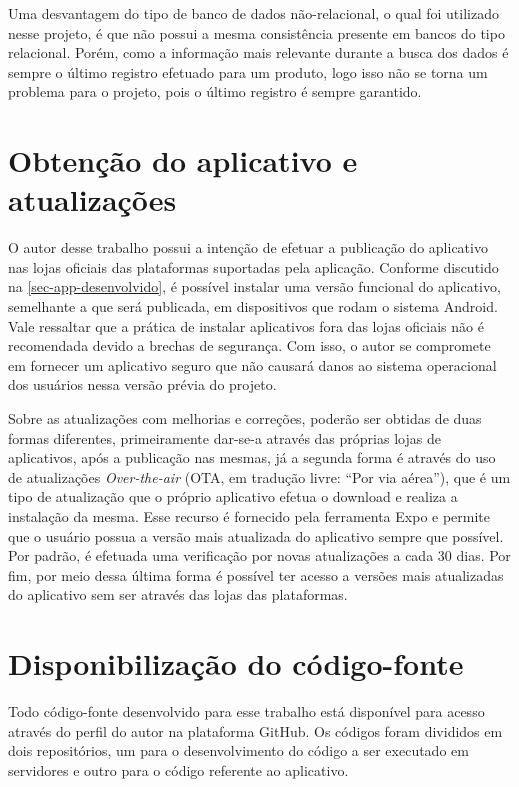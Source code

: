 Uma desvantagem do tipo de banco de dados não-relacional, o qual foi utilizado nesse projeto, é que não possui a mesma consistência presente em bancos do tipo relacional. Porém, como a informação mais relevante durante a busca dos dados é sempre o último registro efetuado para um produto, logo isso não se torna um problema para o projeto, pois o último registro é sempre garantido.

\section{Obtenção do aplicativo e atualizações}

O autor desse trabalho possui a intenção de efetuar a publicação do aplicativo nas lojas oficiais das plataformas suportadas pela aplicação. Conforme discutido na \autoref{sec-app-desenvolvido}, é possível instalar uma versão funcional do aplicativo, semelhante a que será publicada, em dispositivos que rodam o sistema Android. Vale ressaltar que a prática de instalar aplicativos fora das lojas oficiais não é recomendada devido a brechas de segurança. Com isso, o autor se compromete em fornecer um aplicativo seguro que não causará danos ao sistema operacional dos usuários nessa versão prévia do projeto.

Sobre as atualizações com melhorias e correções, poderão ser obtidas de duas formas diferentes, primeiramente dar-se-a através das próprias lojas de aplicativos, após a publicação nas mesmas, já a segunda forma é através do uso de atualizações \textit{Over-the-air} (OTA, em tradução livre: ``Por via aérea''), que é um tipo de atualização que o próprio aplicativo efetua o download e realiza a instalação da mesma. Esse recurso é fornecido pela ferramenta Expo e permite que o usuário possua a versão mais atualizada do aplicativo sempre que possível. Por padrão, é efetuada uma verificação por novas atualizações a cada 30 dias. Por fim, por meio dessa última forma é possível ter acesso a versões mais atualizadas do aplicativo sem ser através das lojas das plataformas.

\section{Disponibilização do código-fonte}

Todo código-fonte desenvolvido para esse trabalho está disponível para acesso através do perfil do autor na plataforma GitHub. Os códigos foram divididos em dois repositórios, um para o desenvolvimento do código a ser executado em servidores e outro para o código referente ao aplicativo.

